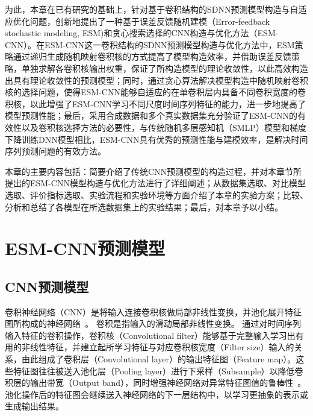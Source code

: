 为此，本章在已有研究的基础上，针对基于卷积结构的SDNN预测模型构造与自适应优化问题，创新地提出了一种基于误差反馈随机建模（Error-feedback stochastic modeling, ESM)和贪心搜索选择的CNN构造与优化方法（ESM-CNN）。在ESM-CNN这一卷积结构的SDNN预测模型构造与优化方法中，ESM策略通过递归生成随机映射卷积核的方式提高了模型构造效率，并借助误差反馈策略，单独求解各卷积核输出权重，保证了所构造模型的理论收敛性，以此高效构造出具有理论收敛性的预测模型；同时，通过贪心算法解决模型构造中随机映射卷积核的选择问题，使得ESM-CNN能够自适应的在单卷积层内具备不同卷积宽度的卷积核，以此增强了ESM-CNN学习不同尺度时间序列特征的能力，进一步地提高了模型预测性能；最后，采用合成数据和多个真实数据集充分验证了ESM-CNN的有效性以及卷积核选择方法的必要性，与传统随机多层感知机（SMLP）模型和梯度下降训练DNN模型相比，ESM-CNN具有优秀的预测性能与建模效率，是解决时间序列预测问题的有效方法。



本章的主要内容包括：简要介绍了传统CNN预测模型的构造过程，并对本章节所提出的ESM-CNN模型构造与优化方法进行了详细阐述；从数据集选取、对比模型选取、评价指标选取、实验流程和实验环境等方面介绍了本章的实验方案；比较、分析和总结了各模型在所选数据集上的实验结果；最后，对本章予以小结。

\section{ESM-CNN预测模型 \label{sec:esm.cnn}}

\subsection{CNN预测模型}
卷积神经网络（CNN）是将输入连接卷积核做局部非线性变换，并池化展开特征图所构成的神经网络~\cite{lecun1995convolutional}。
卷积是指输入的滑动局部非线性变换。
通过对时间序列输入特征的卷积操作，卷积核（Convolutional filter）能够基于完整输入学习出有用的非线性特征，并建立起所学习特征与对应卷积核宽度（Filter size）输入的关系，由此组成了卷积层（Convolutional layer）的输出特征图（Feature map）。这些特征图往往被送入池化层（Pooling layer）进行下采样（Subsample）以降低卷积层的输出带宽（Output band），同时增强神经网络对异常特征图值的鲁棒性~\cite{yang2015deep,zhao2017convolutional,koprinskaConvolutional2018}。
池化操作后的特征图会继续送入神经网络的下一层结构中，以学习更抽象的表示或生成输出结果。

